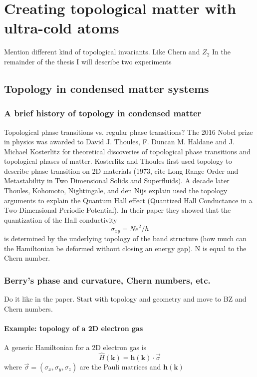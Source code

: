 
\renewcommand{\thechapter}{7}

\chapter{Creating topological matter with ultra-cold atoms}

Mention different kind of topological invariants. Like Chern and $Z_2$
In the remainder of the thesis I will describe two experiments 

\section{Topology in condensed matter systems}

\subsection{A brief history of topology in condensed matter}
Topological phase transitions vs. regular phase transitions?
The 2016 Nobel prize in physics was awarded to David J. Thoules, F. Duncan M. Haldane and J. Michael Kosterlitz for theoretical discoveries of topological phase transitions and topological phases of matter. Kosterlitz and Thoules first used topology to describe phase transition on 2D materials (1973, cite Long Range Order and Metastability in Two Dimensional Solids and Superfluids). A decade later Thoules, Kohomoto, Nightingale, and den Nijs explain used the topology arguments to explain the Quantum Hall effect (Quantized Hall Conductance in a Two-Dimensional Periodic Potential). In their paper they showed that the quantization of the Hall conductivity
%
\begin{equation}
	\sigma_{xy} = Ne^2/h
	\label{eq:hall_conductivity}
\end{equation}
%
is determined by the underlying topology of the band structure (how much can the Hamiltonian be deformed without closing an energy gap). N is equal to the Chern number. 

\subsection{Berry's phase and curvature, Chern numbers, etc.}
Do it like in the paper. Start with topology and geometry and move to BZ and Chern numbers. 

\subsubsection{Example: topology of a 2D electron gas}
A generic Hamiltonian for a 2D electron gas is 
%
\begin{equation}
	\hat{H}(\mathbf{k})= \mathbf{h}(\mathbf{k})\cdot\vec{\sigma}
	\label{eq:2D_Hamiltonian}
\end{equation}
%
where $\vec{\sigma}=(\sigma_x, \sigma_y, \sigma_z)$ are the Pauli matrices and $\mathbf{h}(\mathbf{k})$


